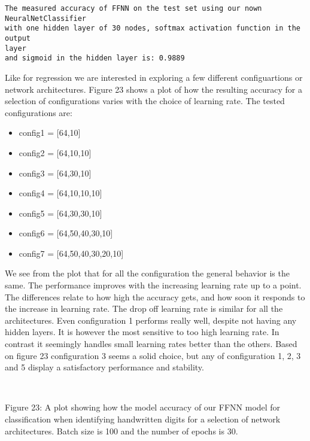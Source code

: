 \documentclass[11pt]{article}
\providecommand{\tightlist}{%
      \setlength{\itemsep}{0pt}\setlength{\parskip}{0pt}}
\begin{document}
    \begin{Verbatim}[commandchars=\\\{\}]
The measured accuracy of FFNN on the test set using our nown NeuralNetClassifier
with one hidden layer of 30 nodes, softmax activation function in the output
layer
and sigmoid in the hidden layer is: 0.9889
    \end{Verbatim}

    Like for regression we are interested in exploring a few different
configuartions or network architectures. Figure 23 shows a plot of how
the resulting accuracy for a selection of configurations varies with the
choice of learning rate. The tested configurations are:

\begin{itemize}
\tightlist
\item
  config1 = {[}64,10{]}
\item
  config2 = {[}64,10,10{]}
\item
  config3 = {[}64,30,10{]}
\item
  config4 = {[}64,10,10,10{]}
\item
  config5 = {[}64,30,30,10{]}
\item
  config6 = {[}64,50,40,30,10{]}
\item
  config7 = {[}64,50,40,30,20,10{]}
\end{itemize}

We see from the plot that for all the configuration the general behavior
is the same. The performance improves with the increasing learning rate
up to a point. The differences relate to how high the accuracy gets, and
how soon it responds to the increase in learning rate. The drop off
learning rate is similar for all the architectures. Even configuration 1
performs really well, despite not having any hidden layers. It is
however the most sensitive to too high learning rate. In contrast it
seemingly handles small learning rates better than the others. Based on
figure 23 configuration 3 seems a solid choice, but any of configuration 1, 2, 3
and 5 display a satisfactory performance and stability.


    \begin{center}
    \end{center}
    { \hspace*{\fill} \\}
    
    Figure 23: A plot showing how the model accuracy of our FFNN model for
classification when identifying handwritten digits for a selection of
network architectures. Batch size is 100 and the number of epochs is 30.
\end{document}
